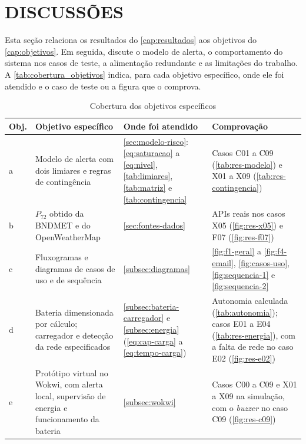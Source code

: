 \chapter{DISCUSSÕES}
\label{cap:discussoes}

Esta seção relaciona os resultados do \autoref{cap:resultados} aos
objetivos do \autoref{cap:objetivos}. Em seguida, discute o modelo de
alerta, o comportamento do sistema nos casos de teste, a alimentação
redundante e as limitações do trabalho.
A \autoref{tab:cobertura_objetivos} indica, para cada objetivo
específico, onde ele foi atendido e o caso de teste ou a figura que o
comprova.

\begin{table}[htb]
\centering
\caption{Cobertura dos objetivos específicos}
\label{tab:cobertura_objetivos}
\small
\begin{tabular}{p{}p{}p{}p{}}
\hline
\textbf{Obj.} & \textbf{Objetivo específico} & \textbf{Onde foi atendido} & \textbf{Comprovação} \\
\hline
a & Modelo de alerta com dois limiares e regras de contingência &
\autoref{sec:modelo-risco}: \autoref{eq:saturacao} a \autoref{eq:nivel},
\autoref{tab:limiares}, \autoref{tab:matriz} e \autoref{tab:contingencia} &
Casos C01 a C09 (\autoref{tab:res-modelo}) e X01 a X09
(\autoref{tab:res-contingencia}) \\
\hline
b & $P_{72}$ obtido da BNDMET e do OpenWeatherMap &
\autoref{sec:fontes-dados} &
APIs reais nos casos X05 (\autoref{fig:res-x05}) e F07
(\autoref{fig:res-f07}) \\
\hline
c & Fluxogramas e diagramas de casos de uso e de sequência &
\autoref{subsec:diagramas} &
\autoref{fig:f1-geral} a \autoref{fig:f4-email}, \autoref{fig:casos-uso},
\autoref{fig:sequencia-1} e \autoref{fig:sequencia-2} \\
\hline
d & Bateria dimensionada por cálculo; carregador e detecção da rede
especificados &
\autoref{subsec:bateria-carregador} e \autoref{subsec:energia}
(\autoref{eq:cap-carga} a \autoref{eq:tempo-carga}) &
Autonomia calculada (\autoref{tab:autonomia}); casos E01 a E04
(\autoref{tab:res-energia}), com a falta de rede no caso E02
(\autoref{fig:res-e02}) \\
\hline
e & Protótipo virtual no Wokwi, com alerta local, supervisão de energia e
funcionamento da bateria &
\autoref{subsec:wokwi} &
Casos C00 a C09 e X01 a X09 na simulação, com o \textit{buzzer} no caso
C09 (\autoref{fig:res-c09}) \\

\end{tabular}
\end{table}
